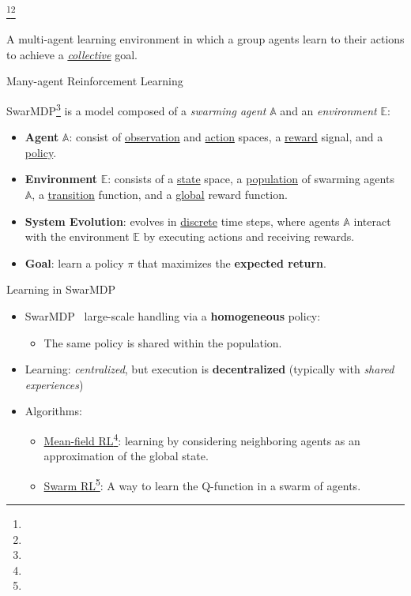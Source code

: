 \documentclass[presentation, 8pt,169]{beamer}\mode<presentation>{\usetheme{AMSBolognaFC}}
\begin{document}
\begin{frame}[plain]
  \begin{center}
\huge{\footnote{\tiny{}}}\footnote{\tiny{}}
  \end{center}
  \begin{center}
    \large{A multi-agent learning environment in which a  group agents learn to  their actions to achieve a \emph{\underline{collective}} goal}.
  \end{center}
\end{frame} 
\begin{frame}{Many-agent Reinforcement Learning}

SwarMDP\footnote{} is a model composed of a \emph{swarming agent} $\mathbb{A}$ and an \emph{environment} $\mathbb{E}$:
  \begin{itemize}
    \item \textbf{Agent} $\mathbb{A}$: consist of \underline{observation} and \underline{action} spaces, a \underline{reward} signal, and a \underline{policy}.
    \item \textbf{Environment} $\mathbb{E}$: consists of a \underline{state} space, a \underline{population} of swarming agents $\mathbb{A}$, a \underline{transition} function, and a \underline{global} reward function.
    \item \textbf{System Evolution}: evolves in \underline{discrete} time steps, where agents $\mathbb{A}$ interact with the environment $\mathbb{E}$ by executing actions and receiving rewards.
    \item \textbf{Goal}: learn a policy $\pi$ that maximizes the \textbf{expected return}.
  \end{itemize}

\begin{block}{Learning in SwarMDP}
  \begin{itemize}
    \item SwarMDP \faArrowRight \, large-scale handling via a \textbf{homogeneous} policy:
      \begin{itemize}
        \item The same policy is shared within the population.
      \end{itemize}
    \item Learning: \emph{centralized}, but execution is \textbf{decentralized} (typically with \emph{shared experiences})
    \item Algorithms:
      \begin{itemize}
        \item \underline{Mean-field RL}\footnote[frame]{}: learning by considering neighboring agents as an approximation of the global state.
        \item \underline{Swarm RL}\footnote[frame]{}: A way to learn the Q-function in a swarm of agents.
      \end{itemize}
  \end{itemize}
\end{block}

\end{frame}
\end{document}

